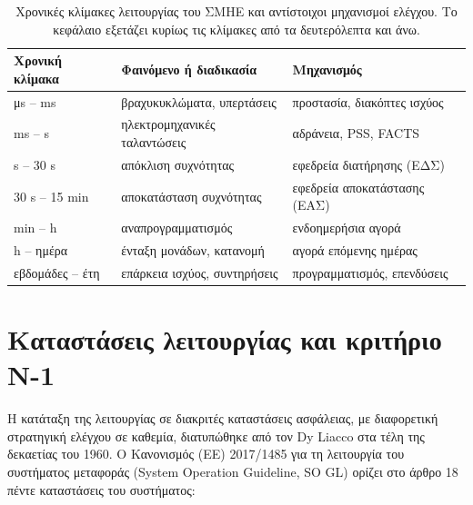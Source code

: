\begin{table}[!htbp]
\centering
\begin{tabular}{lll}
\hline
Χρονική κλίμακα & Φαινόμενο ή διαδικασία & Μηχανισμός \\
\hline
μs -- ms   & βραχυκυκλώματα, υπερτάσεις   & προστασία, διακόπτες ισχύος \\
ms -- s    & ηλεκτρομηχανικές ταλαντώσεις & αδράνεια, PSS, FACTS \\
s -- 30 s  & απόκλιση συχνότητας          & εφεδρεία διατήρησης (ΕΔΣ) \\
30 s -- 15 min & αποκατάσταση συχνότητας  & εφεδρεία αποκατάστασης (ΕΑΣ) \\
min -- h   & αναπρογραμματισμός           & ενδοημερήσια αγορά \\
h -- ημέρα & ένταξη μονάδων, κατανομή     & αγορά επόμενης ημέρας \\
εβδομάδες -- έτη & επάρκεια ισχύος, συντηρήσεις & προγραμματισμός, επενδύσεις \\
\hline
\end{tabular}
\caption{Χρονικές κλίμακες λειτουργίας του ΣΜΗΕ και αντίστοιχοι μηχανισμοί ελέγχου. Το
κεφάλαιο εξετάζει κυρίως τις κλίμακες από τα δευτερόλεπτα και άνω.}
\label{tab:chronikes-klimakes}
\end{table}

\section{Καταστάσεις λειτουργίας και κριτήριο N-1}
\label{sec:states}

Η κατάταξη της λειτουργίας σε διακριτές καταστάσεις ασφάλειας, με διαφορετική στρατηγική
ελέγχου σε καθεμία, διατυπώθηκε από τον Dy Liacco στα τέλη της δεκαετίας του 1960. Ο
Κανονισμός (ΕΕ) 2017/1485 για τη λειτουργία του συστήματος μεταφοράς (System Operation
Guideline, SO GL) ορίζει στο άρθρο 18 πέντε καταστάσεις του συστήματος:

